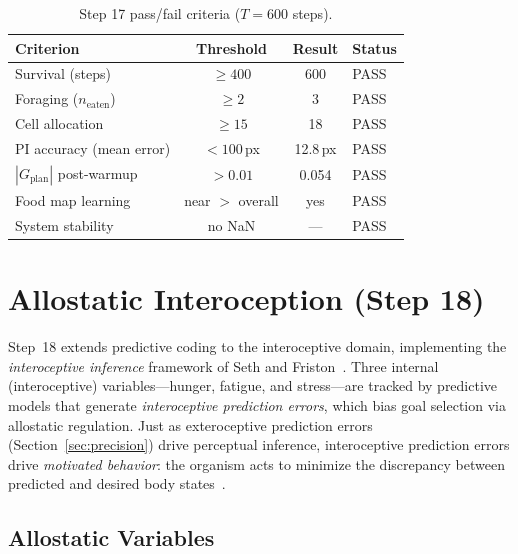\documentclass[11pt,a4paper]{article}
\begin{document}
\begin{table}[H]
\centering
\caption{Step 17 pass/fail criteria ($T = 600$ steps).}
\label{tab:step17_results}
\begin{tabular}{lccl}
\toprule
Criterion & Threshold & Result & Status \\
\midrule
Survival (steps)        & $\geq 400$ & 600  & \textcolor{forage}{PASS} \\
Foraging ($n_\text{eaten}$) & $\geq 2$ & 3 & \textcolor{forage}{PASS} \\
Cell allocation         & $\geq 15$  & 18   & \textcolor{forage}{PASS} \\
PI accuracy (mean error) & $< 100$\,px & 12.8\,px & \textcolor{forage}{PASS} \\
$|G_\text{plan}|$ post-warmup & $> 0.01$ & 0.054 & \textcolor{forage}{PASS} \\
Food map learning       & near $>$ overall & yes & \textcolor{forage}{PASS} \\
System stability        & no NaN & --- & \textcolor{forage}{PASS} \\
\bottomrule
\end{tabular}
\end{table}

\section{Allostatic Interoception (Step 18)}\label{sec:allostasis}

Step~18 extends predictive coding to the interoceptive domain, implementing
the \emph{interoceptive inference} framework of Seth and
Friston~\cite{seth2016,barrett2015}.
Three internal (interoceptive) variables---hunger, fatigue, and
stress---are tracked by predictive models that generate
\emph{interoceptive prediction errors}, which bias goal selection via
allostatic regulation.
Just as exteroceptive prediction errors (Section~\ref{sec:precision})
drive perceptual inference, interoceptive prediction errors drive
\emph{motivated behavior}: the organism acts to minimize the discrepancy
between predicted and desired body states~\cite{pezzulo2015,craig2002}.

\subsection{Allostatic Variables}
\end{document}

